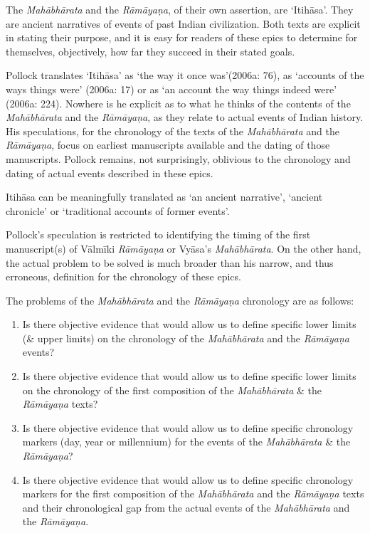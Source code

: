The \textit{Mahābhārata} and the \textit{Rāmāyaṇa}, of their own assertion, are ‘Itihāsa’. They are ancient narratives of events of past Indian civilization. Both texts are explicit in stating their purpose, and it is easy for readers of these epics to determine for themselves, objectively, how far they succeed in their stated goals.

Pollock translates ‘Itihāsa’ as ‘the way it once was’(2006a: 76), as ‘accounts of the ways things were’ (2006a: 17) or as ‘an account the way things indeed were’ (2006a: 224). Nowhere is he explicit as to what he thinks of the contents of the \textit{Mahābhārata} and the \textit{Rāmāyaṇa}, as they relate to actual events of Indian history. His speculations, for the chronology of the texts of the \textit{Mahābhārata} and the \textit{Rāmāyaṇa}, focus on earliest manuscripts available and the dating of those manuscripts. Pollock remains, not surprisingly, oblivious to the chronology and dating of actual events described in these epics.

\newpage

Itihāsa can be meaningfully translated as ‘an ancient narrative’, ‘ancient chronicle’ or ‘traditional accounts of former events’.

Pollock’s speculation is restricted to identifying the timing of the first manuscript(s) of Vālmīki \textit{Rāmāyaṇa} or Vyāsa’s \textit{Mahābhārata}. On the other hand, the actual problem to be solved is much broader than his narrow, and thus erroneous, definition for the chronology of these epics.

The problems of the \textit{Mahābhārata} and the \textit{Rāmāyaṇa} chronology are as follows:

\begin{enumerate}
\itemsep=0pt
\item Is there objective evidence that would allow us to define specific lower limits (\& upper limits) on the chronology of the \textit{Mahābhārata} and the \textit{Rāmāyaṇa} events?

 \item Is there objective evidence that would allow us to define specific lower limits on the chronology of the first composition of the \textit{Mahābhārata} \& the \textit{Rāmāyaṇa} texts?

 \item Is there objective evidence that would allow us to define specific chronology markers (day, year or millennium) for the events of the \textit{Mahābhārata} \& the \textit{Rāmāyaṇa}?

 \item Is there objective evidence that would allow us to define specific chronology markers for the first composition of the \textit{Mahābhārata} and the \textit{Rāmāyaṇa} texts and their chronological gap from the actual events of the \textit{Mahābhārata} and the \textit{Rāmāyaṇa}.

\end{enumerate}

